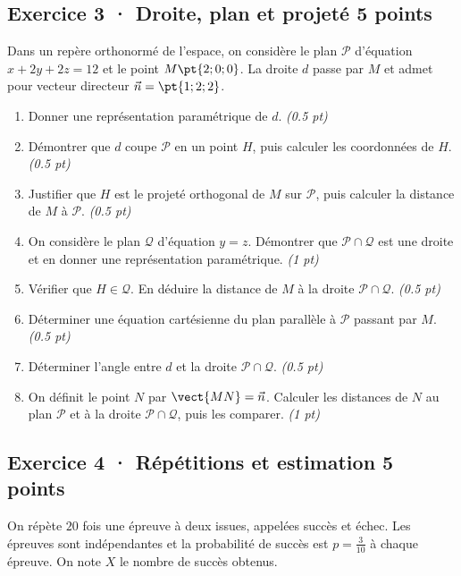 \subsection*{Exercice 3 · Droite, plan et projeté \hfill 5 points}Dans un repère orthonormé de l'espace, on considère le plan $\mathcal P$ d'équation $x+2y+2z=12$ et le point $M\pt{2;0;0}$. La droite $d$ passe par $M$ et admet pour vecteur directeur $\vec n=\pt{1;2;2}$.

\begin{enumerate}

\item Donner une représentation paramétrique de $d$. \hfill\textit{(\num{0,5} pt)}

\item Démontrer que $d$ coupe $\mathcal P$ en un point $H$, puis calculer les coordonnées de $H$. \hfill\textit{(\num{0,5} pt)}

\item Justifier que $H$ est le projeté orthogonal de $M$ sur $\mathcal P$, puis calculer la distance de $M$ à $\mathcal P$. \hfill\textit{(\num{0,5} pt)}

\item On considère le plan $\mathcal Q$ d'équation $y=z$. Démontrer que $\mathcal P\cap\mathcal Q$ est une droite et en donner une représentation paramétrique. \hfill\textit{(1 pt)}

\item Vérifier que $H\in\mathcal Q$. En déduire la distance de $M$ à la droite $\mathcal P\cap\mathcal Q$. \hfill\textit{(\num{0,5} pt)}

\item Déterminer une équation cartésienne du plan parallèle à $\mathcal P$ passant par $M$. \hfill\textit{(\num{0,5} pt)}

\item Déterminer l'angle entre $d$ et la droite $\mathcal P\cap\mathcal Q$. \hfill\textit{(\num{0,5} pt)}

\item On définit le point $N$ par $\vect{MN}=\vec n$. Calculer les distances de $N$ au plan $\mathcal P$ et à la droite $\mathcal P\cap\mathcal Q$, puis les comparer. \hfill\textit{(1 pt)}

\end{enumerate}

\subsection*{Exercice 4 · Répétitions et estimation \hfill 5 points}On répète $20$ fois une épreuve à deux issues, appelées succès et échec. Les épreuves sont indépendantes et la probabilité de succès est $p=\frac{3}{10}$ à chaque épreuve. On note $X$ le nombre de succès obtenus.

